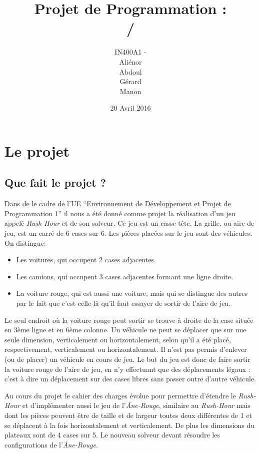 \documentclass{report}
\title{Projet de Programmation :\\ \bsc{rush hour} / \bsc{âne rouge}}
\author{IN400A1 - \bsc{Groupe 6}\\Aliénor \bsc{brabant}\\Abdoul \bsc{diallo}\\Gérard \bsc{lézé}\\{Manon \bsc{philippot}}}
\date{20 Avril 2016}
\begin{document}
\maketitle
\tableofcontents

\part{Le projet}

\chapter{Que fait le projet ?}
Dans de le cadre de l'UE ``Environnement de Développement et Projet de Programmation 1'' il nous a été donné comme projet la réalisation d'un jeu appelé \emph{Rush-Hour} et de son solveur. Ce jeu est un casse tête. La grille, ou aire de jeu, est un carré de 6 cases sur 6. Les pièces placées sur le jeu sont des véhicules. On distingue:
\begin{itemize}
\item Les voitures, qui occupent 2 cases adjacentes.
\item Les camions, qui occupent 3 cases adjacentes formant une ligne droite.
\item La voiture rouge, qui est aussi une voiture, mais qui se distingue des autres par le fait que c’est celle-là qu’il faut essayer de sortir de l’aire de jeu.
\end{itemize}

Le seul endroit où la voiture rouge peut sortir se trouve à droite de la case située en 3ème ligne et en 6ème colonne. Un véhicule ne peut se déplacer que sur une seule dimension, verticalement ou horizontalement, selon qu’il a été placé, respectivement, verticalement ou horizontalement. Il n’est pas permis d’enlever (ou de placer) un véhicule en cours de jeu. Le but du jeu est donc de faire sortir la voiture rouge de l’aire de jeu, en n’y effectuant que des déplacements légaux : c'est à dire un déplacement sur des cases libres sans passer outre d'autre véhicule.

Au cours du projet le cahier des charges évolue pour permettre d’étendre le \emph{Rush-Hour} et d’implémenter aussi le jeu de l’\emph{Âne-Rouge}, similaire au \emph{Rush-Hour} mais dont les pièces peuvent être de taille et de largeur toutes deux différentes de 1 et se déplacent à la fois horizontalement et verticalement. De plus les dimensions du plateaux sont de 4 cases sur 5. Le nouveau solveur devant résoudre les configurations de l'\emph{Âne-Rouge}.
\end{document}

